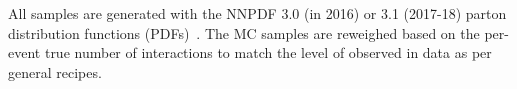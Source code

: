 All samples are generated with the NNPDF 3.0 (in 2016) or 3.1 (2017-18) parton distribution functions (PDFs)~\cite{NNPDF2015}.
The MC samples are reweighed based on the per-event true number of interactions to match the level of \pileup observed in data as per general recipes.


